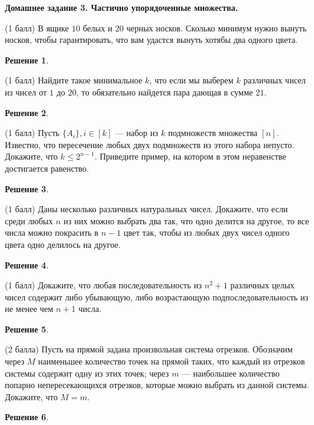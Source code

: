\documentclass[12pt,fleqn,a4paper]{article}
\newtheorem*{solution}{Решение}
\newenvironment{task}[2] {
	\noindent\fbox{\bf {#1} {#2}.}
}{
}
\newcommand{\mytitle}[2] {
  \begin{center}
      \bf {#1} {#2}.
  \end{center}
}
\begin{document}
	\mytitle{Домашнее задание 3.}{Частично упорядоченные множества}
	\begin{task}{DM}{33}
		(1 балл) В ящике $10$ белых и $20$ черных носков. Сколько минимум нужно вынуть носков, чтобы гарантировать, что вам удастся вынуть хотябы два 
		одного цвета.
	\end{task}
	\begin{solution}
	\end{solution}

	\begin{task}{DM}{34}
		(1 балл) Найдите такое минимальное $k$, что если мы выберем $k$ различных чисел из чисел от $1$ до $20$, то обязательно найдется пара 
		дающая в сумме $21$.
	\end{task}
	\begin{solution}
	\end{solution}

	\begin{task}{DM}{35}
		(1 балл) Пусть $\{A_i\}, i \in [k]$ — набор из $k$ подмножеств множества $[n]$. Известно, что пересечение любых двух подмножеств 
		из этого набора непусто. Докажите, что $k \leq  2^{n-1}$. Приведите пример, на котором в этом неравенстве достигается равенство.
	\end{task}
	\begin{solution}
	\end{solution}

	\begin{task}{DM}{36}
		(1 балл) Даны несколько различных натуральных чисел. Докажите, что если среди
		любых $n$ из них можно выбрать два так, что одно делится на другое, то все 
		числа можно покрасить в $n - 1$ цвет так, чтобы из любых двух чисел одного
		цвета одно делилось на другое.
	\end{task}
	\begin{solution}
	\end{solution}

	\begin{task}{DM}{37}
		(1 балл) Докажите, что любая последовательность из $n^2 + 1$ различных целых чисел содержит либо убывающую, либо возрастающую подпоследовательность 
		из не менее чем $n + 1$ числа.
	\end{task}
	\begin{solution}
	\end{solution}

	\begin{task}{DM}{38}
		(2 балла) Пусть на прямой задана произвольная система отрезков. Обозначим
		через $M$ наименьшее количество точек на прямой таких, что каждый из
		отрезков системы содержит одну из этих точек; через $m$ — наибольшее
		количество попарно непересекающихся отрезков, которые можно выбрать из
		данной системы. Докажите, что $M = m$.
	\end{task}
	\begin{solution}
	\end{solution}
\end{document}

